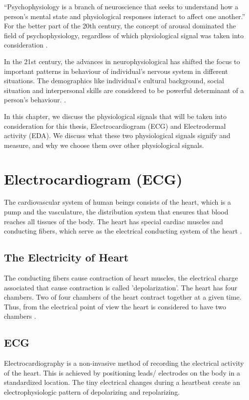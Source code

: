 \label{chapter:terminology}
\enquote{Psychophysiology is a branch of neuroscience that seeks to understand how a person's mental state and physiological responses interact to affect one another.} \cite{def_psychophysiology} For the better part of the 20th century, the concept of arousal dominated the field of psychophysiology, regardless of which physiological signal was taken into consideration \cite{cacioppo_strong_2016_p_3_15}.

In the 21st century, the advances in neurophysiological has shifted the focus to important patterns in behaviour of individual's nervous system in different situations. The demographics like individual's cultural background, social situation and interpersonal skills are considered to be powerful determinant of a person's behaviour. \cite{cacioppo_strong_2016_p_3_15}.

In this chapter, we discuss the physiological signals that will be taken into consideration for this thesis, Electrocardiogram (ECG) and Electrodermal activity (EDA). We discuss what these two physiological signals signify and measure, and why we choose them over other physiological signals.

\section{Electrocardiogram (ECG)}
The cardiovascular system of human beings consists of the heart, which is a pump and the vasculature, the distribution system that ensures that blood reaches all tissues of the body. The heart has special cardiac muscles and conducting fibers, which serve as the electrical conducting system of the heart \cite{cacioppo_cardiovascular_2016_p_183_216}.

\subsection{The Electricity of Heart} The conducting fibers cause contraction of heart muscles, the electrical charge associated that cause contraction is called 'depolarization'. The heart has four chambers. Two of four chambers of the heart contract together at a given time. Thus, from the electrical point of view the heart is considered to have two chambers \cite{hampton_ecg_2013}.

\subsection{ECG} Electrocardiography is a non-invasive method of recording the electrical activity of the heart. This is achieved by positioning leads/ electrodes on the body in a standardized location. The tiny electrical changes during a heartbeat create an electrophysiologic pattern of depolarizing and repolarizing.
